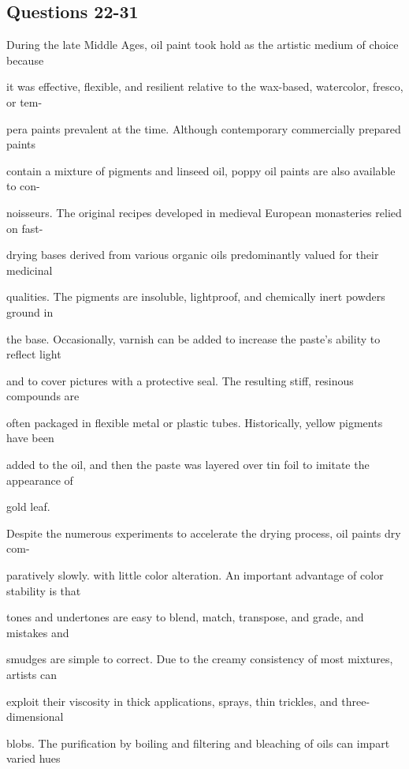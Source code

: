 \documentclass[12pt]{article}
\begin{document}
\subsection*{Questions 22-31}
\begingroup
\small
\sloppy
\setlength{\parskip}{0pt}
\setlength{\parindent}{0pt}
During the late Middle Ages, oil paint took hold as the artistic medium of choice because\par
it was effective, flexible, and resilient relative to the wax-based, watercolor, fresco, or tem-\par
pera paints prevalent at the time. Although contemporary commercially prepared paints\par
contain a mixture of pigments and linseed oil, poppy oil paints are also available to con-\par
noisseurs. The original recipes developed in medieval European monasteries relied on fast-\par
drying bases derived from various organic oils predominantly valued for their medicinal\par
qualities. The pigments are insoluble, lightproof, and chemically inert powders ground in\par
the base. Occasionally, varnish can be added to increase the paste's ability to reflect light\par
and to cover pictures with a protective seal. The resulting stiff, resinous compounds are\par
often packaged in flexible metal or plastic tubes. Historically, yellow pigments have been\par
added to the oil, and then the paste was layered over tin foil to imitate the appearance of\par
gold leaf.\par
Despite the numerous experiments to accelerate the drying process, oil paints dry com-\par
paratively slowly. with little color alteration. An important advantage of color stability is that\par
tones and undertones are easy to blend, match, transpose, and grade, and mistakes and\par
smudges are simple to correct. Due to the creamy consistency of most mixtures, artists can\par
exploit their viscosity in thick applications, sprays, thin trickles, and three-dimensional\par
blobs. The purification by boiling and filtering and bleaching of oils can impart varied hues\par
\end{document}
